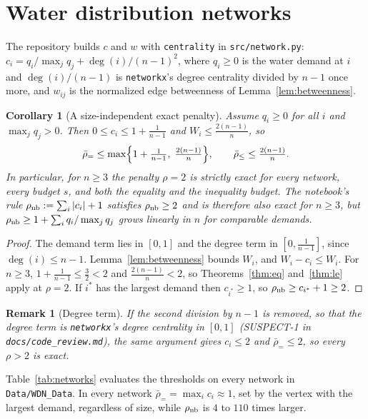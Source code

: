\documentclass[11pt]{article}
\newtheorem{corollary}[theorem]{Corollary}
\newtheorem{remark}[theorem]{Remark}
\newcommand{\rbeq}{\bar\rho_{=}}
\newcommand{\rble}{\bar\rho_{\le}}
\begin{document}
\section{Water distribution networks}
\label{sec:wdn}

The repository builds $c$ and $w$ with \texttt{centrality} in
\texttt{src/network.py}: $c_i=q_i/\max_jq_j+\deg(i)/(n-1)^2$, where $q_i\ge0$ is
the water demand at $i$ and $\deg(i)/(n-1)$ is \texttt{networkx}'s degree
centrality divided by $n-1$ once more, and $w_{ij}$ is the normalized edge
betweenness of Lemma~\ref{lem:betweenness}.

\begin{corollary}[A size-independent exact penalty]
\label{cor:wdn}
Assume $q_i\ge0$ for all $i$ and $\max_jq_j>0$. Then $0\le c_i\le1+\frac1{n-1}$ and
$W_i\le\frac{2(n-1)}{n}$, so
\[
\rbeq\le\max\Bigl\{1+\tfrac1{n-1},\;\tfrac{2(n-1)}{n}\Bigr\},
\qquad
\rble\le\tfrac{2(n-1)}{n}.
\]
In particular, for $n\ge3$ the penalty $\rho=2$ is strictly exact for every
network, every budget $s$, and both the equality and the inequality budget. The
notebook's rule $\rho_{\rm nb}:=\sum_i|c_i|+1$ satisfies $\rho_{\rm nb}\ge2$ and is
therefore also exact for $n\ge3$, but
$\rho_{\rm nb}\ge1+\sum_iq_i/\max_jq_j$ grows linearly in $n$ for comparable
demands.
\end{corollary}

\begin{proof}
The demand term lies in $[0,1]$ and the degree term in $[0,\frac1{n-1}]$, since
$\deg(i)\le n-1$. Lemma~\ref{lem:betweenness} bounds $W_i$, and
$W_i-c_i\le W_i$. For $n\ge3$, $1+\frac1{n-1}\le\frac32<2$ and
$\frac{2(n-1)}n<2$, so Theorems~\ref{thm:eq} and~\ref{thm:le} apply at $\rho=2$.
If $i^\ast$ has the largest demand then $c_{i^\ast}\ge1$, so
$\rho_{\rm nb}\ge c_{i^\ast}+1\ge2$.
\end{proof}

\begin{remark}[Degree term]
\label{rem:degree}
If the second division by $n-1$ is removed, so that the degree term is
\texttt{networkx}'s degree centrality in $[0,1]$ (SUSPECT-1 in
\texttt{docs/code\_review.md}), the same argument gives $c_i\le2$ and $\rbeq\le2$,
so every $\rho>2$ is exact.
\end{remark}

Table~\ref{tab:networks} evaluates the thresholds on every network in
\texttt{Data/WDN\_Data}. In every network $\rbeq=\max_ic_i\approx1$, set by the
vertex with the largest demand, regardless of size, while $\rho_{\rm nb}$ is $4$ to
$110$ times larger.
\end{document}
